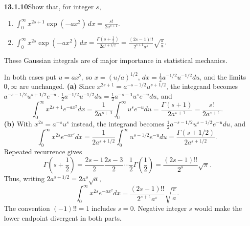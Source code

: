 \par\bigskip
\noindent\textbf{13.1.10}\quad Show that, for integer $s$,
\begin{enumerate}
\item[(a)] $\displaystyle\int_{0}^{\infty}x^{2s+1}\exp(-ax^{2})\,dx
  =\frac{s!}{2a^{s+1}}$.
\item[(b)] $\displaystyle\int_{0}^{\infty}x^{2s}\exp(-ax^{2})\,dx
  =\frac{\Gamma(s+\frac{1}{2})}{2a^{s+1/2}}
  =\frac{(2s-1)!!}{2^{s+1}a^{s}}\sqrt{\frac{\pi}{a}}$.
\end{enumerate}
These Gaussian integrals are of major importance in statistical mechanics.
\par\smallskip
{}
\solution
{}
In both cases put $u=ax^2$, so $x=(u/a)^{1/2}$,
$dx=\tfrac12a^{-1/2}u^{-1/2}du$, and the limits $0,\infty$ are
unchanged.
\textbf{(a)} Since $x^{2s+1}=a^{-s-1/2}u^{s+1/2}$, the integrand
becomes
$a^{-s-1/2}u^{s+1/2}e^{-u}\cdot\tfrac12a^{-1/2}u^{-1/2}du
=\tfrac12a^{-s-1}u^se^{-u}du$, and
\[
\int_0^\infty x^{2s+1}e^{-ax^2}dx
=\frac1{2a^{s+1}}\int_0^\infty u^se^{-u}du
=\frac{\Gamma(s+1)}{2a^{s+1}}
=\boxed{\frac{s!}{2a^{s+1}}}.
\]
\textbf{(b)} With $x^{2s}=a^{-s}u^s$ instead, the integrand becomes
$\tfrac12a^{-s-1/2}u^{s-1/2}e^{-u}du$, and
\[
\int_0^\infty x^{2s}e^{-ax^2}dx
=\frac1{2a^{s+1/2}}\int_0^\infty u^{s-1/2}e^{-u}du
=\frac{\Gamma(s+1/2)}{2a^{s+1/2}}.
\]
Repeated recurrence gives
\[
\Gamma\left(s+\frac12\right)
=\frac{2s-1}{2}\frac{2s-3}{2}\cdots\frac12\Gamma\left(\frac12\right)
=\frac{(2s-1)!!}{2^s}\sqrt\pi.
\]
Thus, writing $2a^{s+1/2}=2a^s\sqrt a$,
\[
\boxed{\int_0^\infty x^{2s}e^{-ax^2}dx
=\frac{(2s-1)!!}{2^{s+1}a^s}\sqrt{\frac\pi a}}.
\]
The convention $(-1)!!=1$ includes $s=0$.  Negative integer $s$
would make the lower endpoint divergent in both parts.


